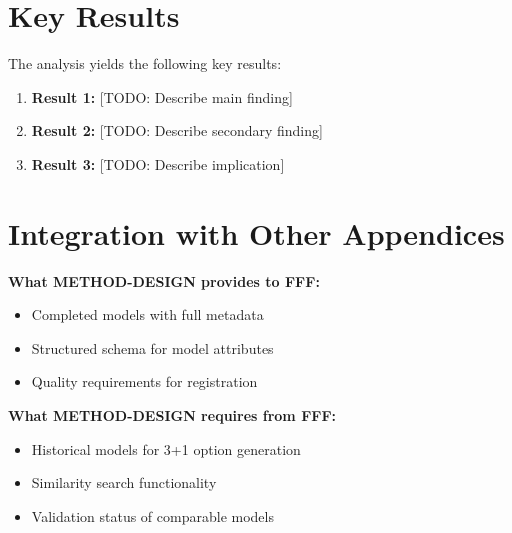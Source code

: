 
\section{Key Results}
\label{sec:results}

The analysis yields the following key results:

\begin{enumerate}
    \item \textbf{Result 1:} [TODO: Describe main finding]
    \item \textbf{Result 2:} [TODO: Describe secondary finding]
    \item \textbf{Result 3:} [TODO: Describe implication]
\end{enumerate}

\section{Integration with Other Appendices}
\label{sec:eee-integration}

\begin{tcolorbox}[colback=yellow!5!white, colframe=yellow!75!black,
    title=Integration: METHOD-DESIGN $\leftrightarrow$ METHOD-REGISTRY (FFF)]
\textbf{What METHOD-DESIGN provides to FFF:}
\begin{itemize}[nosep]
\item Completed models with full metadata
\item Structured schema for model attributes
\item Quality requirements for registration
\end{itemize}

\textbf{What METHOD-DESIGN requires from FFF:}
\begin{itemize}[nosep]
\item Historical models for 3+1 option generation
\item Similarity search functionality
\item Validation status of comparable models
\end{itemize}
\end{tcolorbox}

